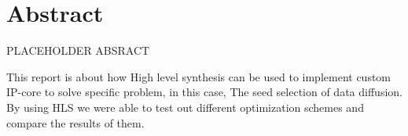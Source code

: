 \section*{Abstract}

PLACEHOLDER ABSRACT

This report is about how High level synthesis can be used to implement custom IP-core to solve specific problem, in this case, The seed selection of data diffusion. By using HLS we were able to test out different optimization schemes and compare the results of them. 
